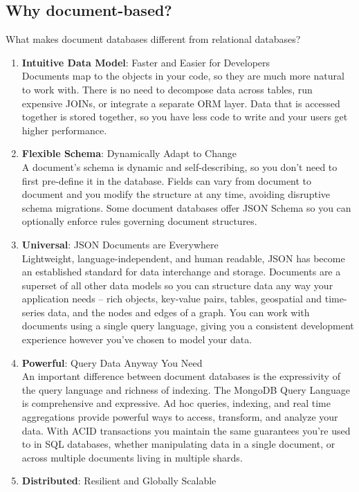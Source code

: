 \documentclass[10pt,a4paper]{article}
\begin{document}
 \subsection{Why document-based?}
 What makes document databases different from relational databases?
 
 \begin{enumerate}
 	\item \textbf{Intuitive Data Model}: Faster and Easier for Developers \\
 	Documents map to the objects in your code, so they are much more natural to work with. There is no need to decompose data across tables, run expensive JOINs, or integrate a separate ORM layer. Data that is accessed together is stored together, so you have less code to write and your users get higher performance.
 	\item \textbf{Flexible Schema}: Dynamically Adapt to Change \\
 	A document’s schema is dynamic and self-describing, so you don’t need to first pre-define it in the database. Fields can vary from document to document and you modify the structure at any time, avoiding disruptive schema migrations. Some document databases offer JSON Schema so you can optionally enforce rules governing document structures.
 	\item \textbf{Universal}: JSON Documents are Everywhere \\
 	Lightweight, language-independent, and human readable, JSON has become an established standard for data interchange and storage. Documents are a superset of all other data models so you can structure data any way your application needs – rich objects, key-value pairs, tables, geospatial and time-series data, and the nodes and edges of a graph. You can work with documents using a single query language, giving you a consistent development experience however you’ve chosen to model your data.
 	\item \textbf{Powerful}: Query Data Anyway You Need \\
 	An important difference between document databases is the expressivity of the query language and richness of indexing. The MongoDB Query Language is comprehensive and expressive. Ad hoc queries, indexing, and real time aggregations provide powerful ways to access, transform, and analyze your data. With ACID transactions you maintain the same guarantees you’re used to in SQL databases, whether manipulating data in a single document, or across multiple documents living in multiple shards.
 	\item \textbf{Distributed}: Resilient and Globally Scalable \\ 

\end{enumerate}
\end{document}
